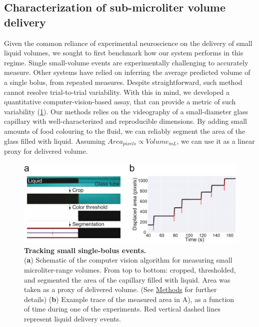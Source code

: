 \subsection*{Characterization of sub-microliter volume delivery}

Given the common reliance of experimental neuroscience on the delivery of small liquid volumes, we sought to first benchmark how our system performs in this regime. Single small-volume events are experimentally challenging to accurately measure. Other systems have relied on inferring the average predicted volume of a single bolus, from repeated measures. Despite straightforward, such method cannot resolve trial-to-trial variability. With this in mind, we developed a quantitative computer-vision-based assay, that can provide a metric of such variability (\cref{fig:PumpProtocol}). Our methods relies on the videography of a small-diameter glass capillary with well-characterized and reproducible dimensions. By adding small amounts of food colouring to the fluid, we can reliably segment the area of the glass filled with liquid. Assuming $Area_{pixels} \propto Volume_{mL}$, we can use it as a linear proxy for delivered volume. 

\begin{figure} 
	\centering
	\includegraphics[width=1.0\linewidth]{Figures/Artboard 1_1.pdf}
	\caption{\textbf{Tracking small single-bolus events.}\\
		(\textbf{a}) Schematic of the computer vision algorithm for measuring small microliter-range volumes. From top to bottom: cropped, thresholded, and segmented the area of the capillary filled with liquid. Area was taken as a proxy of delivered volume. (See \hyperref[s:methods]{Methods} for further details)  (\textbf{b}) Example trace of the measured area in A), as a function of time during one of the experiments. Red vertical dashed lines represent liquid delivery events.}
	\label{fig:PumpProtocol}  
\end{figure}


